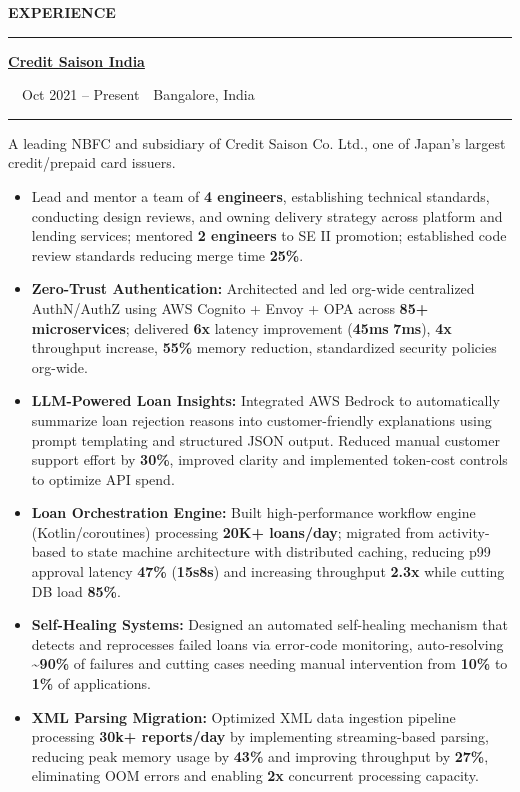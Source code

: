 \documentclass[a4paper,11pt]{article}
\newcommand{\cvsection}[1]{%
  \vspace{1pt}
  {\color{dark}\normalsize\bfseries\MakeUppercase{#1}}\par
  \vspace{-5pt}
  {\color{dark}\rule{\linewidth}{1.1pt}}\par
  \vspace{1pt}
}
\newcommand{\cventry}[5]{%
  \vspace{2pt}
  {\large\color{accent}\bfseries\href{#2}{#1}}\par
  \vspace{1pt}
  \hspace{2em}{\bfseries #3}~\textbar~{\small #4}~\textbar~{\small #5}\par
  \vspace{1pt}
  {\color{pillborder}\rule{\linewidth}{0.7pt}}\par
  \vspace{1pt}
}
\begin{document}
\noindent
\begin{minipage}[t]{0.62\textwidth}

\cvsection{Experience}

\cventry{Credit Saison India}{https://creditsaison.in}{Lead Software Engineer}{Oct 2021 -- Present}{Bangalore, India}
{\small A leading NBFC and subsidiary of Credit Saison Co. Ltd., one of Japan's largest credit/prepaid card issuers.}
\vspace{2pt}
\begin{itemize}
  \setlength{\baselineskip}{12pt}
  \item Lead and mentor a team of \textbf{4 engineers}, establishing technical standards, conducting design reviews, and owning delivery strategy across platform and lending services; mentored \textbf{2 engineers} to SE II promotion; established code review standards reducing merge time \textbf{25\%}.
  \item \textbf{Zero-Trust Authentication:} Architected and led org-wide centralized AuthN/AuthZ using AWS Cognito + Envoy + OPA across \textbf{85+ microservices}; delivered \textbf{6x} latency improvement (\textbf{45ms} \textrightarrow{} \textbf{7ms}), \textbf{4x} throughput increase, \textbf{55\%} memory reduction, standardized security policies org-wide.
  \item \textbf{LLM-Powered Loan Insights:} Integrated AWS Bedrock to automatically summarize loan rejection reasons into customer-friendly explanations using prompt templating and structured JSON output. Reduced manual customer support effort by \textbf{30\%}, improved clarity and implemented token-cost controls to optimize API spend.
  \item \textbf{Loan Orchestration Engine:} Built high-performance workflow engine (Kotlin/coroutines) processing \textbf{20K+ loans/day}; migrated from activity-based to state machine architecture with distributed caching, reducing p99 approval latency \textbf{47\%} (\textbf{15s}\textrightarrow{}\textbf{8s}) and increasing throughput \textbf{2.3x} while cutting DB load \textbf{85\%}.
  \item \textbf{Self-Healing Systems:} Designed an automated self-healing mechanism that detects and reprocesses failed loans via error-code monitoring, auto-resolving \textasciitilde\textbf{90\%} of failures and cutting cases needing manual intervention from \textbf{10\%} to \textbf{1\%} of applications.
  \item \textbf{XML Parsing Migration:} Optimized XML data ingestion pipeline processing \textbf{30k+ reports/day} by implementing streaming-based parsing, reducing peak memory usage by \textbf{43\%} and improving throughput by \textbf{27\%}, eliminating OOM errors and enabling \textbf{2x} concurrent processing capacity.

\end{itemize}
\end{minipage}
\end{document}
